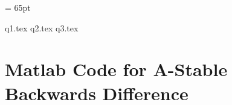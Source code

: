 \documentclass[12pt]{extarticle}
\begin{document}
      

        \thispagestyle{firstpage}
        \headsep = 65pt %

        {q1.tex}     
        {q2.tex}
        {q3.tex}

        \pagebreak
        \section*{Matlab Code for A-Stable Backwards Difference}
        
        
\end{document}
